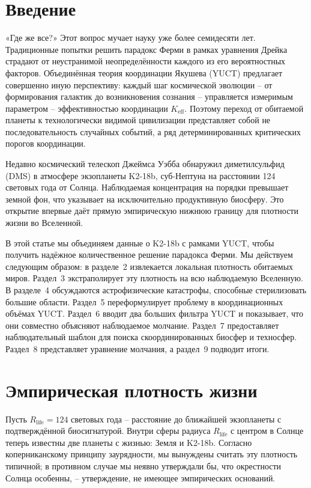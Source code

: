 \documentclass[11pt,a4paper]{article}
\newcommand{\Keff}{K_{\mathrm{eff}}}
\begin{document}
	\tableofcontents
	\newpage
	
	\section{Введение}
	\label{sec:intro}
	
	«Где же все?» Этот вопрос мучает науку уже более семидесяти лет. Традиционные попытки решить парадокс Ферми в рамках уравнения Дрейка страдают от неустранимой неопределённости каждого из его вероятностных факторов. Объединённая теория координации Якушева (YUCT) предлагает совершенно иную перспективу: каждый шаг космической эволюции – от формирования галактик до возникновения сознания – управляется измеримым параметром – эффективностью координации \(\Keff\). Поэтому переход от обитаемой планеты к технологически видимой цивилизации представляет собой не последовательность случайных событий, а ряд детерминированных критических порогов координации.
	
	Недавно космический телескоп Джеймса Уэбба обнаружил диметилсульфид (DMS) в атмосфере экзопланеты K2-18b, суб-Нептуна на расстоянии 124 световых года от Солнца. Наблюдаемая концентрация на порядки превышает земной фон, что указывает на исключительно продуктивную биосферу. Это открытие впервые даёт прямую эмпирическую нижнюю границу для плотности жизни во Вселенной.
	
	В этой статье мы объединяем данные о K2-18b с рамками YUCT, чтобы получить надёжное количественное решение парадокса Ферми. Мы действуем следующим образом: в разделе~2 извлекается локальная плотность обитаемых миров. Раздел~3 экстраполирует эту плотность на всю наблюдаемую Вселенную. В разделе~4 обсуждаются астрофизические катастрофы, способные стерилизовать большие области. Раздел~5 переформулирует проблему в координационных объёмах YUCT. Раздел~6 вводит два больших фильтра YUCT и показывает, что они совместно объясняют наблюдаемое молчание. Раздел~7 предоставляет наблюдательный шаблон для поиска скоординированных биосфер и техносфер. Раздел~8 представляет уравнение молчания, а раздел~9 подводит итоги.
	
	\section{Эмпирическая плотность жизни}
	\label{sec:empirical}
	Пусть \(R_{\mathrm{life}} = 124\) световых года – расстояние до ближайшей экзопланеты с подтверждённой биосигнатурой. Внутри сферы радиуса \(R_{\mathrm{life}}\) с центром в Солнце теперь известны две планеты с жизнью: Земля и K2-18b. Согласно коперниканскому принципу заурядности, мы вынуждены считать эту плотность типичной; в противном случае мы неявно утверждали бы, что окрестности Солнца особенны, – утверждение, не имеющее эмпирических оснований.
	
\end{document}
